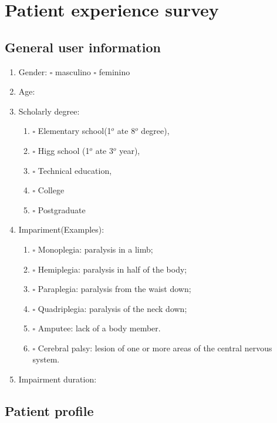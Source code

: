 \chapter{Patient experience survey}
\label{sec:patientsurvey}

\section{General user information}

\begin{enumerate}
\item Gender: $\square$ masculino $\square$ feminino
\item Age: 
\item Scholarly degree:
\begin{enumerate}[label=(\alph*)]
\item $\square$ Elementary school(1$^{o}$ ate 8$^{o}$  degree),
\item $\square$ Higg school (1$^{o}$  ate 3$^{o}$  year),
\item $\square$ Technical education,
\item $\square$ College
\item $\square$ Postgraduate
\end{enumerate}
\item Impariment(Examples):
\begin{enumerate}[label=(\alph*)]
\item $\square$ Monoplegia: paralysis in a limb;
\item $\square$ Hemiplegia: paralysis in half of the body;
\item $\square$ Paraplegia: paralysis from the waist down;
\item $\square$ Quadriplegia: paralysis of the neck down;
\item $\square$ Amputee: lack of a body member.
\item $\square$ Cerebral palsy: lesion of one or more areas of the central nervous system.
\end{enumerate}
\item  Impairment duration:
\end{enumerate}

\section{Patient profile}

